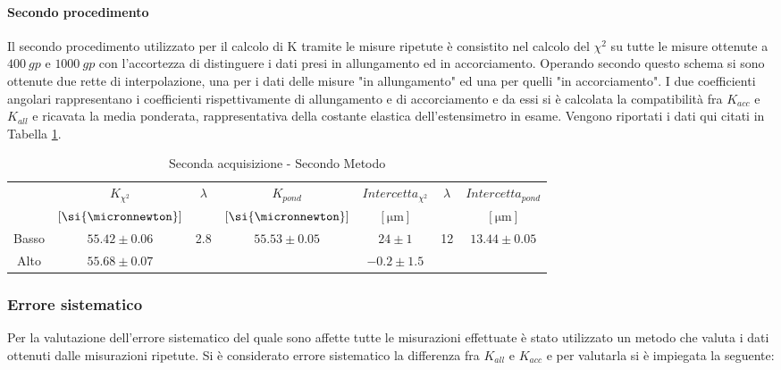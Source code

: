 \documentclass[a4paper,11pt,oneside]{article}
\begin{document}
\paragraph{Secondo procedimento}
Il secondo procedimento utilizzato per il calcolo di K tramite le misure ripetute è consistito nel calcolo del $\chi^2$ su tutte le misure ottenute a $\SI{400}{gp}$ e $\SI{1000}{gp}$ con l'accortezza di distinguere i dati presi in allungamento ed in accorciamento. Operando secondo questo schema si sono ottenute due rette di interpolazione, una per i dati delle misure "in allungamento" ed una per quelli "in accorciamento". I due coefficienti angolari rappresentano i coefficienti rispettivamente di allungamento e di accorciamento e da essi si è calcolata la compatibilità fra ${K}_{acc}$ e ${K}_{all}$ e ricavata la media ponderata, rappresentativa della costante elastica dell'estensimetro in esame. Vengono riportati i dati qui citati in Tabella \ref{tab:2ac_2met}. %

\begin{table}[h!]
\centering
\caption{Seconda acquisizione - Secondo Metodo}
\label{tab:2ac_2met}
\begin{tabular}{|c|c|c|c|c|c|c|}
    \hline
    & $K_{\chi^2}$ & \multirow{2}{*}{$\lambda$} & $K_{pond}$ & $Intercetta_{\chi^2}$ & \multirow{2}{*}{$\lambda$} & $Intercetta_{pond}$\\
    &$[\si{\micronnewton}]$&&$[\si{\micronnewton}]$& $[\si{\micro\meter}]$ & & $[\si{\micro\meter}]$\\ \hline
    {\cellcolor[rgb]{0.85,0.85,0.85}}Basso & {\cellcolor[rgb]{0.85,0.85,0.85}}$55.42\pm0.06$  & \multirow{2}{*}{2.8}  & \multirow{2}{*}{$55.53\pm0.05$} & {\cellcolor[rgb]{0.85,0.85,0.85}}$24\pm1$   &   \multirow{2}{*}{12} & \multirow{2}{*}{$13.44\pm0.05$}   \\ \cline{1-2} \cline{5-5}
    Alto  & $55.68\pm0.07$ & & & $-0.2\pm1.5$ & & \\ \hline
\end{tabular}
\end{table}

\subsubsection*{Errore sistematico}\label{par:errore_desalva}
Per la valutazione dell'errore sistematico del quale sono affette tutte le misurazioni effettuate è stato utilizzato un metodo che valuta i dati ottenuti dalle misurazioni ripetute. Si è considerato errore sistematico la differenza fra $K_{all}$ e $K_{acc}$ e per valutarla si è impiegata la seguente:
\end{document}
